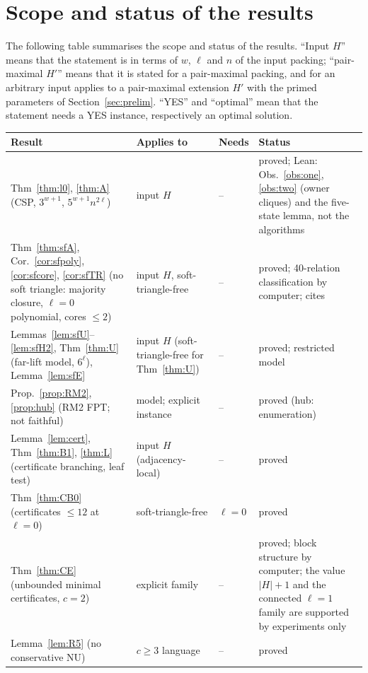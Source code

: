 \section{Scope and status of the results}\label{app:status}
The following table summarises the scope and status of the results. ``Input $H$'' means that the statement is in terms of $w$, $\ell$ and $n$ of the input packing; ``pair-maximal $H'$'' means that it is stated for a pair-maximal packing, and for an arbitrary input applies to a pair-maximal extension $H'$ with the primed parameters of Section~\ref{sec:prelim}. ``YES'' and ``optimal'' mean that the statement needs a YES instance, respectively an optimal solution.
{\small
\begin{longtable}{@{}>{\raggedright\arraybackslash}p{}>{\raggedright\arraybackslash}p{}>{\raggedright\arraybackslash}p{}>{\raggedright\arraybackslash}p{}@{}}
\hline
Result & Applies to & Needs & Status\\
\hline
\endhead
Thm~\ref{thm:l0}, \ref{thm:A} (CSP, $3^{w+1}$, $5^{w+1}n^{2\ell}$) & input $H$ & -- & proved; Lean: Obs.~\ref{obs:one}, \ref{obs:two} (owner cliques) and the five-state lemma, not the algorithms\\
Thm~\ref{thm:sfA}, Cor.~\ref{cor:sfpoly}, \ref{cor:sfcore}, \ref{cor:sfTR} (no soft triangle: majority closure, $\ell=0$ polynomial, cores $\le2$) & input $H$, soft-triangle-free & -- & proved; 40-relation classification by computer; cites~\cite{JCC98}\\
Lemmas~\ref{lem:sfU}--\ref{lem:sfH2}, Thm~\ref{thm:U} (far-lift model, $6^{\ell}$), Lemma~\ref{lem:sfE} & input $H$ (soft-triangle-free for Thm~\ref{thm:U}) & -- & proved; restricted model\\
Prop.~\ref{prop:RM2}, \ref{prop:hub} (RM2 FPT; not faithful) & model; explicit instance & -- & proved (hub: enumeration)\\
Lemma~\ref{lem:cert}, Thm~\ref{thm:B1}, \ref{thm:L} (certificate branching, leaf test) & input $H$ (adjacency-local) & -- & proved\\
Thm~\ref{thm:CB0} (certificates $\le12$ at $\ell=0$) & soft-triangle-free & $\ell=0$ & proved\\
Thm~\ref{thm:CE} (unbounded minimal certificates, $c=2$) & explicit family & -- & proved; block structure by computer; the value $|H|+1$ and the connected $\ell=1$ family are supported by experiments only\\
Lemma~\ref{lem:R5} (no conservative NU) & $c\ge3$ language & -- & proved\\

\end{longtable}}
